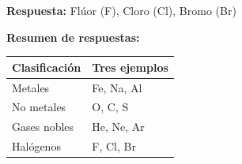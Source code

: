 \begin{exercise}
\begin{solu}
        \textbf{Respuesta:} Flúor (F), Cloro (Cl), Bromo (Br)

        \textbf{Resumen de respuestas:}
        \begin{center}
            \begin{tabular}{@{}ll@{}}
                \toprule
                \textbf{Clasificación} & \textbf{Tres ejemplos} \\
                \midrule
                Metales & Fe, Na, Al \\[3pt]
                No metales & O, C, S \\[3pt]
                Gases nobles & He, Ne, Ar \\[3pt]
                Halógenos & F, Cl, Br \\
                \bottomrule
            \end{tabular}
        \end{center}
    \end{solu}
\end{exercise}
%
%
